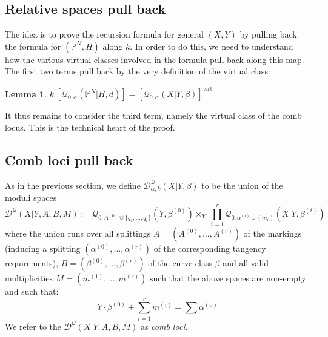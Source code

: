 \documentclass[11pt]{amsart}
\newcommand{\Q}[4]{\mathcal{Q}_{#1,#2}(#3,#4)}
\newcommand{\PP}{\mathbb P}
\newcommand{\virt}[1]{[#1]^{\operatorname{virt}}}
\theoremstyle{definition}
\newtheorem{lemma}[thm]{Lemma}
\theoremstyle{definition}
\begin{document}
\subsection{Relative spaces pull back}
The idea is to prove the recursion formula for general $(X,Y)$ by pulling back the formula for $(\PP^N,H)$ along $k$. In order to do this, we need to understand how the various virtual classes involved in the formula pull back along this map. The first two terms pull back by the very definition of the virtual class:
\begin{lemma} \label{Relative spaces pull back} $k^! [\Q{0}{\alpha}{\PP^N|H}{d}] = \virt{\Q{0}{\alpha}{X|Y}{\beta}}$ \end{lemma}

\noindent It thus remains to consider the third term, namely the virtual class of the comb locus. This is the technical heart of the proof.

\subsection{Comb loci pull back} \label{Subsection comb loci pull back} As in the previous section, we define $\mathcal D^\mathcal{Q}_{\alpha,k}(X|Y,\beta)$ to be the union of the moduli spaces
\begin{equation*} \mathcal D^{\mathcal{Q}}(X|Y,A,B,M) := \Q{0}{A^{(0)} \cup \{q_1, \ldots, q_r\}}{Y}{\beta^{(0)}} \times_{Y^r} \prod_{i=1}^r \Q{0}{\alpha^{(i)}\cup (m_i)}{X|Y}{\beta^{(i)}} \end{equation*}
where the union runs over all splittings $A = (A^{(0)},\ldots,A^{(r)})$ of the markings (inducing a splitting $(\alpha^{(0)}, \ldots, \alpha^{(r)})$ of the corresponding tangency requirements), $B = (\beta^{(0)}, \ldots, \beta^{(r)})$ of the curve class $\beta$ and all valid multiplicities $M = (m^{(1)}, \ldots, m^{(r)})$ such that the above spaces are non-empty and such that:
\[
Y \cdot \beta^{(0)} +\sum_{i=1}^r m^{(i)}=\sum \alpha^{(0)}
\]
We refer to the $\mathcal D^{\mathcal{Q}}(X|Y,A,B,M)$ as \emph{comb loci}.
\end{document}
